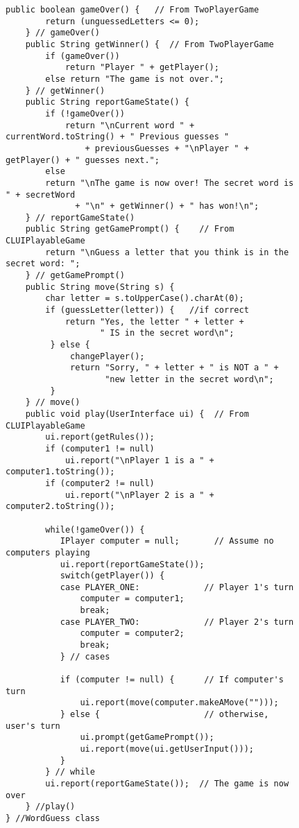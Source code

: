 \begin{figure}[h!]
\jjjprogstart
\begin{jjjlisting}[29pc]
\begin{lstlisting}[basicstyle=\scriptsize]
    public boolean gameOver() {   // From TwoPlayerGame
        return (unguessedLetters <= 0);
    } // gameOver()
    public String getWinner() {  // From TwoPlayerGame
        if (gameOver())
            return "Player " + getPlayer();
        else return "The game is not over.";
    } // getWinner()
    public String reportGameState() {   
        if (!gameOver())
            return "\nCurrent word " + currentWord.toString() + " Previous guesses " 
                + previousGuesses + "\nPlayer " + getPlayer() + " guesses next.";
        else
	    return "\nThe game is now over! The secret word is " + secretWord 
              + "\n" + getWinner() + " has won!\n";
    } // reportGameState()
    public String getGamePrompt() {    // From CLUIPlayableGame
        return "\nGuess a letter that you think is in the secret word: ";
    } // getGamePrompt()
    public String move(String s) {   
        char letter = s.toUpperCase().charAt(0);
        if (guessLetter(letter)) {   //if correct 
            return "Yes, the letter " + letter +
                   " IS in the secret word\n";
         } else {   
             changePlayer();
             return "Sorry, " + letter + " is NOT a " +
                    "new letter in the secret word\n";
         } 
    } // move()
    public void play(UserInterface ui) {  // From CLUIPlayableGame
        ui.report(getRules());
        if (computer1 != null) 
            ui.report("\nPlayer 1 is a " + computer1.toString());
        if (computer2 != null)
            ui.report("\nPlayer 2 is a " + computer2.toString());

        while(!gameOver()) {  
           IPlayer computer = null;       // Assume no computers playing
           ui.report(reportGameState());
           switch(getPlayer()) {
           case PLAYER_ONE:             // Player 1's turn
               computer = computer1;
               break;
           case PLAYER_TWO:             // Player 2's turn
               computer = computer2;
               break;
           } // cases

           if (computer != null) {      // If computer's turn
               ui.report(move(computer.makeAMove("")));
           } else {                     // otherwise, user's turn
               ui.prompt(getGamePrompt());
               ui.report(move(ui.getUserInput()));
           }
        } // while
        ui.report(reportGameState());  // The game is now over
    } //play()
} //WordGuess class
\end{lstlisting}
\end{jjjlisting}
\end{figure}


